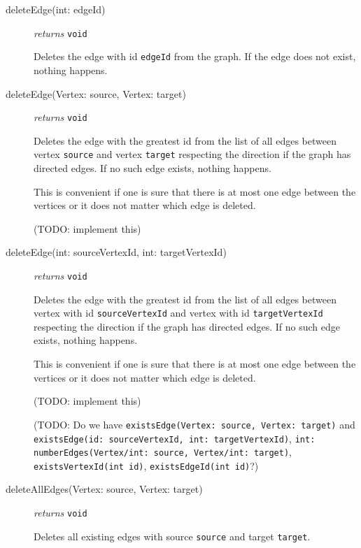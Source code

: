 \documentclass{article}
\begin{document}
\begin{description}
\item[deleteEdge(int: edgeId)] \emph{returns} \texttt{void}

Deletes the edge with id \texttt{edgeId} from the graph. If the edge does not exist, nothing
happens.

\item[deleteEdge(Vertex: source, Vertex: target)] \emph{returns}
  \texttt{void}

  Deletes the edge with the greatest id from the list of all edges
  between vertex \texttt{source} and vertex \texttt{target} respecting
  the direction if the graph has directed edges. If no such edge exists, nothing happens.

  This is convenient if one is sure that there is at most one edge
  between the vertices or it does not matter which edge is deleted.

  (TODO: implement this)

\item[deleteEdge(int: sourceVertexId, int: targetVertexId)] \emph{returns}
  \texttt{void}

  Deletes the edge with the greatest id from the list of all edges
  between vertex with id \texttt{sourceVertexId} and vertex with id \texttt{targetVertexId} respecting
  the direction if the graph has directed edges. If no such edge exists, nothing happens.

  This is convenient if one is sure that there is at most one edge
  between the vertices or it does not matter which edge is deleted.

  (TODO: implement this)

  (TODO: Do we have \texttt{existsEdge(Vertex: source, Vertex:
    target)} and \texttt{existsEdge(id: sourceVertexId, int:
    targetVertexId)}, \texttt{int: numberEdges(Vertex/int: source,
    Vertex/int: target)}, \texttt{existsVertexId(int id)}, \texttt{existsEdgeId(int id)}?)
\item[deleteAllEdges(Vertex: source, Vertex: target)] \emph{returns}
  \texttt{void}

  Deletes all existing edges with source \texttt{source} and target
  \texttt{target}.
  
\end{description}
\end{document}
